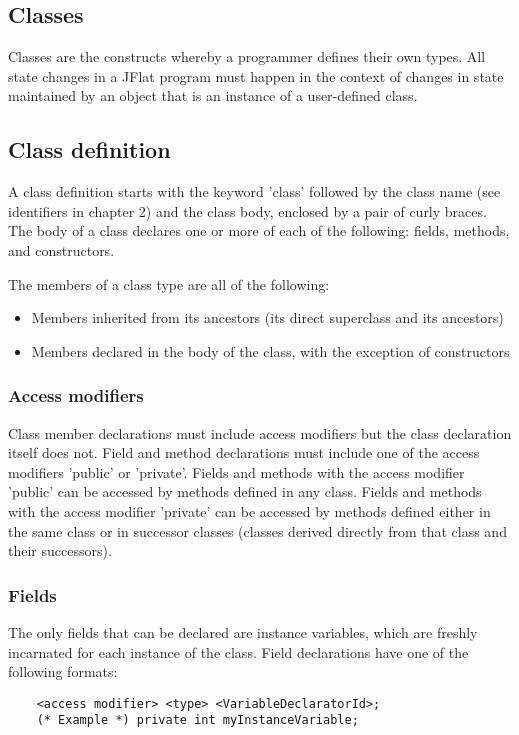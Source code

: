 \begin{homeworkProblem}
	\chapter{Classes}
	
	Classes are the constructs whereby a programmer defines their own types. All state changes in a JFlat program must happen in the context of changes in state maintained by an object that is an instance of a user-defined class.
	
	\section{Class definition}
	A class definition starts with the keyword 'class' followed by the class name (see identifiers in chapter 2) and the class body, enclosed by a pair of curly braces. The body of a class declares one or more of each of the following: fields, methods, and constructors.
	
	The members of a class type are all of the following:
	\begin{itemize}
		\item Members inherited from its ancestors (its direct superclass and its ancestors)
		\item Members declared in the body of the class, with the exception of constructors
	\end{itemize}
	
	\subsection{Access modifiers}
	Class member declarations must include access modifiers but the class declaration itself does not. Field and method declarations must include one of the access modifiers 'public' or 'private'. Fields and methods with the access modifier 'public' can be accessed by methods defined in any class. Fields and methods with the access modifier 'private' can be accessed by methods defined either in the same class or in successor classes (classes derived directly from that class and their successors).
	
	\subsection{Fields}
	The only fields that can be declared are instance variables, which are freshly incarnated for each instance of the class.
	Field declarations have one of the following formats:
	\begin{verbatim}
	<access modifier> <type> <VariableDeclaratorId>;
	(* Example *) private int myInstanceVariable;
	

\end{verbatim}
\end{homeworkProblem}
